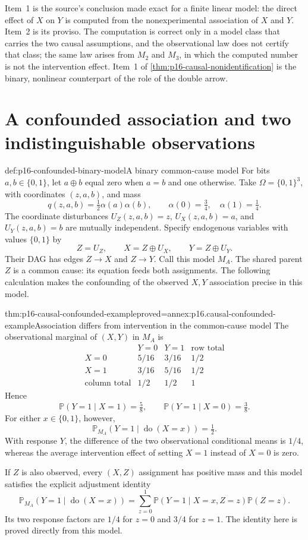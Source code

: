 Item~1 is the source's conclusion made exact for a finite linear
model: the direct effect of \(X\) on \(Y\) is computed from the
nonexperimental association of \(X\) and \(Y\). Item~2 is its proviso.
The computation is correct only in a model class that carries the two
causal assumptions, and the observational law does not certify that
class; the same law arises from \(M_2\) and \(M_3\), in which the
computed number is not the intervention effect. Item~1 of
\cref{thm:p16-causal-nonidentification} is the binary, nonlinear
counterpart of the role of the double arrow.

\section{A confounded association and two indistinguishable observations}
\label{sec:p16-causal-confounding-example}

\begin{hbdefinition}{def:p16-confounded-binary-model}{A binary common-cause model}
For bits \(a,b\in\{0,1\}\), let \(a\oplus b\) equal zero when
\(a=b\) and one otherwise. Take
\(\Omega=\{0,1\}^3\), with coordinates \((z,a,b)\), and mass
\[
 q(z,a,b)=\tfrac12\alpha(a)\alpha(b),\qquad
 \alpha(0)=\tfrac34,\quad\alpha(1)=\tfrac14.
\]
The coordinate disturbances \(U_Z(z,a,b)=z\),
\(U_X(z,a,b)=a\), and \(U_Y(z,a,b)=b\) are mutually independent.
Specify endogenous variables with values \(\{0,1\}\) by
\[
 Z=U_Z,\qquad X=Z\oplus U_X,\qquad Y=Z\oplus U_Y.
\]
Their DAG has edges \(Z\to X\) and \(Z\to Y\).
Call this model \(M_A\). The shared parent \(Z\) is a common cause:
its equation feeds both assignments. The following calculation makes the
confounding of the observed \(X,Y\) association precise in this model.
\end{hbdefinition}

\begin{hbtheorem}{thm:p16-causal-confounded-example}{proved=annex:p16.causal-confounded-example}{Association differs from intervention in the common-cause model}
The observational marginal of \((X,Y)\) in \(M_A\) is
\[
\begin{array}{c|cc|c}
 &Y=0&Y=1&\text{row total}\\\hline
 X=0&5/16&3/16&1/2\\
 X=1&3/16&5/16&1/2\\\hline
 \text{column total}&1/2&1/2&1
\end{array}
\]
Hence
\[
 \mathbb P(Y=1\mid X=1)=\tfrac58,\qquad
 \mathbb P(Y=1\mid X=0)=\tfrac38.
\]
For either \(x\in\{0,1\}\), however,
\[
 \mathbb P_{M_A}(Y=1\mid\operatorname{do}(X=x))=\tfrac12.
\]
With response \(Y\), the difference of the two observational conditional
means is \(1/4\), whereas the average intervention effect of setting
\(X=1\) instead of \(X=0\) is zero.

If \(Z\) is also observed, every \((X,Z)\) assignment has positive
mass and this model satisfies the explicit adjustment identity
\[
 \mathbb P_{M_A}(Y=1\mid\operatorname{do}(X=x))
 =\sum_{z=0}^1\mathbb P(Y=1\mid X=x,Z=z)\mathbb P(Z=z).
\]
Its two response factors are \(1/4\) for \(z=0\) and \(3/4\)
for \(z=1\). The identity here is proved directly from this model.
\end{hbtheorem}

